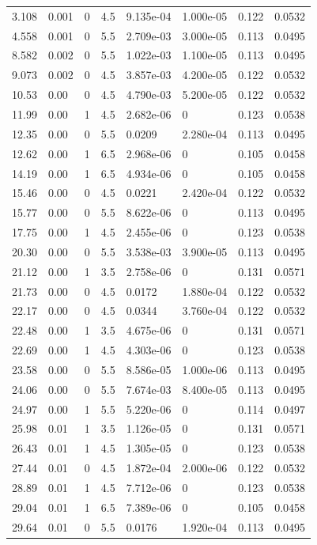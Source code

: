 \documentclass[preview]{standalone}
\begin{document}
{{\begin{tabular}{L{1.2cm}C{1.2cm} C{0.3cm}C{0.5cm} C{1.4cm}C{1.4cm} C{1.4cm}C{1.4cm}}
  3.108  &  0.001  & 0     & 4.5 &  9.135e-04  & 1.000e-05  & 0.122 &  0.0532   \\ 
  4.558  &  0.001  & 0     & 5.5 &  2.709e-03  & 3.000e-05  & 0.113 &  0.0495   \\ 
  8.582  &  0.002  & 0     & 5.5 &  1.022e-03  & 1.100e-05  & 0.113 &  0.0495   \\ 
  9.073  &  0.002  & 0     & 4.5 &  3.857e-03  & 4.200e-05  & 0.122 &  0.0532   \\ 
  10.53  &  0.00  & 0     & 4.5 &  4.790e-03  & 5.200e-05  & 0.122 &  0.0532   \\ 
  11.99  &  0.00  & 1     & 4.5 &  2.682e-06  & 0  & 0.123 &  0.0538   \\ 
  12.35  &  0.00  & 0     & 5.5 &  0.0209  & 2.280e-04  & 0.113 &  0.0495   \\ 
  12.62  &  0.00  & 1     & 6.5 &  2.968e-06  & 0  & 0.105 &  0.0458   \\ 
  14.19  &  0.00  & 1     & 6.5 &  4.934e-06  & 0  & 0.105 &  0.0458   \\ 
  15.46  &  0.00  & 0     & 4.5 &  0.0221  & 2.420e-04  & 0.122 &  0.0532   \\ 
  15.77  &  0.00  & 0     & 5.5 &  8.622e-06  & 0  & 0.113 &  0.0495   \\ 
  17.75  &  0.00  & 1     & 4.5 &  2.455e-06  & 0  & 0.123 &  0.0538   \\ 
  20.30  &  0.00  & 0     & 5.5 &  3.538e-03  & 3.900e-05  & 0.113 &  0.0495   \\ 
  21.12  &  0.00  & 1     & 3.5 &  2.758e-06  & 0  & 0.131 &  0.0571   \\ 
  21.73  &  0.00  & 0     & 4.5 &  0.0172  & 1.880e-04  & 0.122 &  0.0532   \\ 
  22.17  &  0.00  & 0     & 4.5 &  0.0344  & 3.760e-04  & 0.122 &  0.0532   \\ 
  22.48  &  0.00  & 1     & 3.5 &  4.675e-06  & 0  & 0.131 &  0.0571   \\ 
  22.69  &  0.00  & 1     & 4.5 &  4.303e-06  & 0  & 0.123 &  0.0538   \\ 
  23.58  &  0.00  & 0     & 5.5 &  8.586e-05  & 1.000e-06  & 0.113 &  0.0495   \\ 
  24.06  &  0.00  & 0     & 5.5 &  7.674e-03  & 8.400e-05  & 0.113 &  0.0495   \\ 
  24.97  &  0.00  & 1     & 5.5 &  5.220e-06  & 0  & 0.114 &  0.0497   \\ 
  25.98  &  0.01  & 1     & 3.5 &  1.126e-05  & 0  & 0.131 &  0.0571   \\ 
  26.43  &  0.01  & 1     & 4.5 &  1.305e-05  & 0  & 0.123 &  0.0538   \\ 
  27.44  &  0.01  & 0     & 4.5 &  1.872e-04  & 2.000e-06  & 0.122 &  0.0532   \\ 
  28.89  &  0.01  & 1     & 4.5 &  7.712e-06  & 0  & 0.123 &  0.0538   \\ 
  29.04  &  0.01  & 1     & 6.5 &  7.389e-06  & 0  & 0.105 &  0.0458   \\ 
  29.64  &  0.01  & 0     & 5.5 &  0.0176  & 1.920e-04  & 0.113 &  0.0495   \\ 
\hline 
\end{tabular} 

}}
\end{document}
